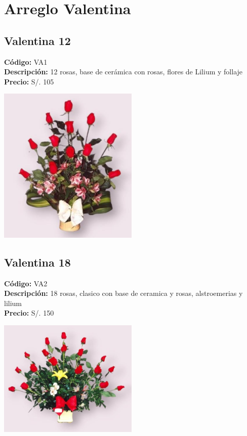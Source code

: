 \section*{Arreglo Valentina}
\subsection*{Valentina 12}
\textbf{Código:} VA1 \\
\textbf{Descripción:} 12 rosas, base de cerámica con rosas, flores de Lilium y follaje \\
\textbf{Precio:} S/. 105 \\
\begin{center}
\includegraphics[width=0.5\textwidth]{imagenes_extraidas/image_10_3}
\end{center}
\subsection*{Valentina 18}
\textbf{Código:} VA2 \\
\textbf{Descripción:} 18 rosas, clasico con base de ceramica y rosas, alstroemerias y lilium \\
\textbf{Precio:} S/. 150 \\
\begin{center}
\includegraphics[width=0.5\textwidth]{imagenes_extraidas/image_10_4}
\end{center}
